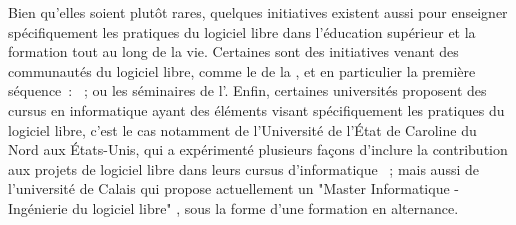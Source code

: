 Bien qu'elles soient plutôt rares, quelques initiatives existent aussi pour enseigner spécifiquement les
pratiques du logiciel libre dans l'éducation supérieur et la formation tout au long de la vie. Certaines sont
des initiatives venant des communautés du logiciel libre, comme le %
de la , et en particulier la première séquence : %
 ; ou les
séminaires de l'.
Enfin, certaines universités proposent des cursus en informatique ayant des éléments visant spécifiquement les
pratiques du logiciel libre, c'est le cas notamment de l'Université de l'État de Caroline du Nord aux
États-Unis, qui a expérimenté plusieurs façons d'inclure la contribution aux projets de logiciel libre dans
leurs cursus d'informatique  ; mais aussi de l'université de Calais
qui propose actuellement un "Master Informatique - Ingénierie du logiciel libre"%
,
sous la forme d'une formation en alternance.
